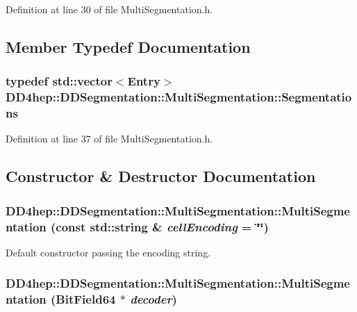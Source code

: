 Definition at line 30 of file MultiSegmentation.h.

\subsection{Member Typedef Documentation}
\hypertarget{class_d_d4hep_1_1_d_d_segmentation_1_1_multi_segmentation_a083ba7cc081c5c3c47cafac5980100f8}{
\subsubsection[{Segmentations}]{\setlength{\rightskip}{0pt plus 5cm}typedef std::vector$<${\bf Entry}$>$ {\bf DD4hep::DDSegmentation::MultiSegmentation::Segmentations}}}
\label{class_d_d4hep_1_1_d_d_segmentation_1_1_multi_segmentation_a083ba7cc081c5c3c47cafac5980100f8}


Definition at line 37 of file MultiSegmentation.h.

\subsection{Constructor \& Destructor Documentation}
\hypertarget{class_d_d4hep_1_1_d_d_segmentation_1_1_multi_segmentation_ad1a80e739f693a231afc09295a565e85}{
\subsubsection[{MultiSegmentation}]{\setlength{\rightskip}{0pt plus 5cm}DD4hep::DDSegmentation::MultiSegmentation::MultiSegmentation (const std::string \& {\em cellEncoding} = {\ttfamily \char`\"{}\char`\"{}})}}
\label{class_d_d4hep_1_1_d_d_segmentation_1_1_multi_segmentation_ad1a80e739f693a231afc09295a565e85}


Default constructor passing the encoding string. \hypertarget{class_d_d4hep_1_1_d_d_segmentation_1_1_multi_segmentation_a2d73598a701bfad32ba2be3793799bd8}{
\subsubsection[{MultiSegmentation}]{\setlength{\rightskip}{0pt plus 5cm}DD4hep::DDSegmentation::MultiSegmentation::MultiSegmentation ({\bf BitField64} $\ast$ {\em decoder})}}
\label{class_d_d4hep_1_1_d_d_segmentation_1_1_multi_segmentation_a2d73598a701bfad32ba2be3793799bd8}


